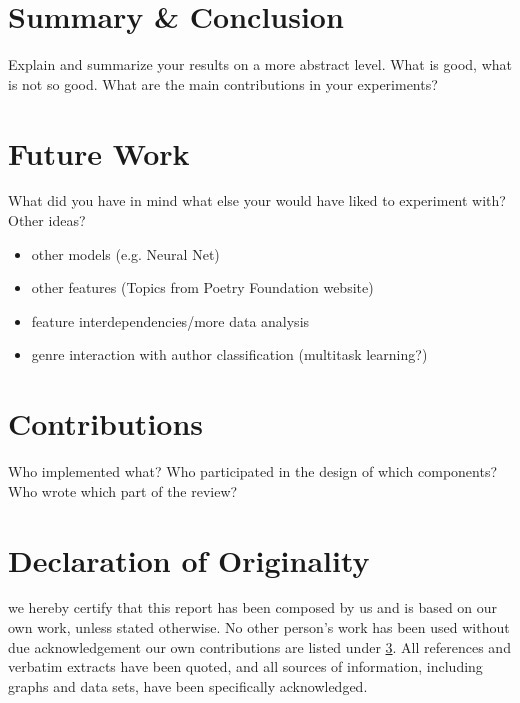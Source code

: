 \documentclass[11pt]{article}
\begin{document}
\section{Summary \& Conclusion}

Explain and summarize your results on a more abstract level. What is good, what is not so
good. What are the main contributions in your experiments?


\section{Future Work}

What did you have in mind what else your
would have liked to experiment with? Other ideas?
\begin{itemize}
\item other models (e.g. Neural Net)
\item other features (Topics from Poetry Foundation website)
\item feature interdependencies/more data analysis
\item genre interaction with author classification (multitask learning?)
\end{itemize}





\appendix

\section{Contributions}\label{sec:cont}
Who implemented what?
Who participated in the design of which components?
Who wrote which part of the review?
\section{Declaration of Originality}
we hereby certify that this report has been composed by us and is based on our own work, unless 
stated otherwise. No other person’s work has been used without due acknowledgement our own contributions 
are listed under \ref{sec:cont}. All references and verbatim extracts have been quoted, and all 
sources of information, including graphs and data sets, have been specifically acknowledged.
\end{document}
